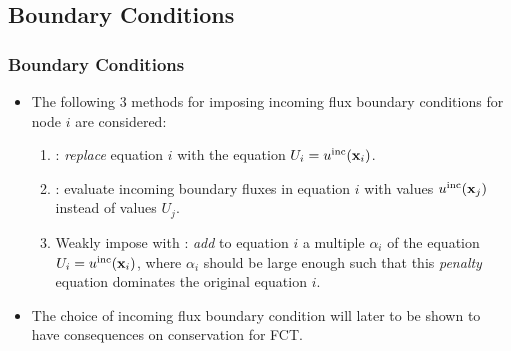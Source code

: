 \subsection{Boundary Conditions}
\begin{frame}
\frametitle{Boundary Conditions}

\begin{itemize}
  \item The following 3 methods for imposing incoming flux boundary conditions
    for node $i$ are considered:
    \begin{enumerate}
      \item {}: \emph{replace} equation $i$ with the equation
        $U_i = u^{\textup{inc}}(\mathbf{x}_i)$.
      \item {}: evaluate incoming boundary fluxes 
        in equation $i$ with values $u^{\textup{inc}}(\mathbf{x}_j)$ instead of values $U_j$.
      \item Weakly impose with : \emph{add} to
        equation $i$ a multiple $\alpha_i$ of the equation $U_i = u^{\textup{inc}}(\mathbf{x}_i)$,
        where $\alpha_i$ should be large enough such that this \emph{penalty}
        equation dominates the original equation $i$.
    \end{enumerate}
  \item The choice of incoming flux boundary condition will later to
    be shown to have consequences on conservation for FCT.
\end{itemize}

\end{frame}
